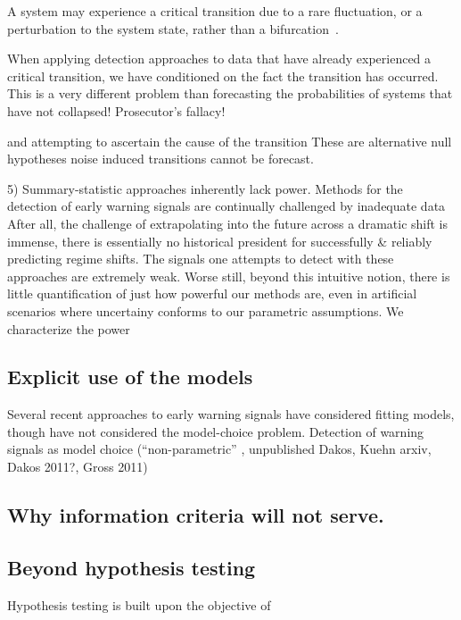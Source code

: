 \documentclass[authoryear,preprint,11pt]{elsarticle}
\begin{document}
A system may experience a critical transition due to a rare fluctuation,
or a perturbation to the system state, %
rather than a bifurcation~\citep{Scheffer2001, Scheffer2009}.  

When applying detection approaches to data that have already experienced a critical transition,
we have conditioned on the fact the transition has occurred.  This is a very different problem than 
forecasting the probabilities of systems that have not collapsed!  Prosecutor's fallacy!

and attempting to ascertain the cause of the transition
These are alternative null hypotheses 
\citep{Ditlevsen2010} %
\citep{Livina2012} noise induced transitions cannot be forecast.  


5) Summary-statistic approaches inherently lack power. 
Methods for the detection of early warning signals are continually challenged by 
inadequate data  %
After all, the challenge of extrapolating into the future across a dramatic shift is immense,
there is essentially no historical president for successfully \& reliably predicting regime shifts. %
The signals one attempts to detect with these approaches are extremely weak.
Worse still, beyond this intuitive notion, there is little quantification of just how powerful our methods are,
even in artificial scenarios where uncertainy conforms to our parametric assumptions.  
We characterize the power



\subsection{Explicit use of the models}
Several recent approaches to early warning signals have considered fitting models, though have not considered the model-choice problem.  
Detection of warning signals as model choice (``non-parametric'' \citet{Carpenter2011e},  unpublished Dakos, Kuehn arxiv, Dakos 2011?, Gross 2011)


\subsection{Why information criteria will not serve.}


\subsection{Beyond hypothesis testing}
Hypothesis testing is built upon the objective of 
\end{document}
